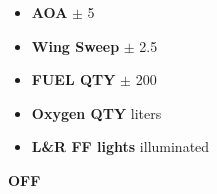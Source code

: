 \begin{tablenumerate}
{\begin{subenumerate}
\begin{itemize}
            \item \textbf{AOA}  $\pm$ 5
            \item \textbf{Wing Sweep}  $\pm$ 2.5
            \item \textbf{FUEL QTY}  $\pm$ 200
            \item \textbf{Oxygen QTY}  liters
            \item \textbf{L\&R FF lights} \dotfill illuminated
        \end{itemize}
        \item \textbf{OFF}
    \end{subenumerate}}
\end{tablenumerate}

\clearpage


